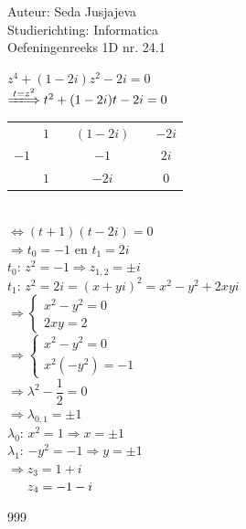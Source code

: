 \documentclass[a4paper]{article}
\begin{document}
\noindent \large Auteur: Seda Jusjajeva\\
\noindent \large Studierichting: Informatica\\
\noindent \large Oefeningenreeks 1D nr. 24.1\\

\medskip

\normalsize


$z^4 + (1-2i)z^2 -2i = 0$ \\

$\xLongrightarrow[]{t = z^2} t^2 + (1-2i)t - 2i = 0$ \\

\begin{tabular}{c|ccccc}
         & $1$ && $(1-2i)$  &       & $-2i$ \\
    $-1$ &     && $-1$      &       & $2i$  \\ 
\hline
         & $1$ && $-2i$     &\vline & $0$   \\
\end{tabular} \\

$\Leftrightarrow (t+1)(t-2i) = 0$ \\

$\Rightarrow t_0 = -1$ en $t_1 = 2i$ \\

$t_0$: $z^2 = -1 \Rightarrow z_{1,2} = \pm i$ \\

$t_1$: $z^2 = 2i = (x+yi)^2 = x^2 - y^2 + 2xyi$ \\

$\Rightarrow \left\{\begin{array}{l}
    x^2 - y^2 = 0 \\
    2xy = 2
\end{array}\right.$ \\

$\Rightarrow \left\{\begin{array}{l}
    x^2 - y^2 = 0 \\
    x^2(-y^2) = -1
\end{array}\right.$ \\

$\Rightarrow \lambda^2 - \dfrac{1}{2} = 0$ \\

$\Rightarrow \lambda_{0,1} = \pm 1$ \\

$\lambda_0$: $ x^2 = 1 \Rightarrow x = \pm 1$ \\

$\lambda_1$: $ -y^2 = -1 \Rightarrow y = \pm 1$ \\

$\Rightarrow z_3 = 1+i$\\ 

$\indent z_4 = -1-i$ \\



\begin{thebibliography}{999}
\end{thebibliography}
\end{document}
